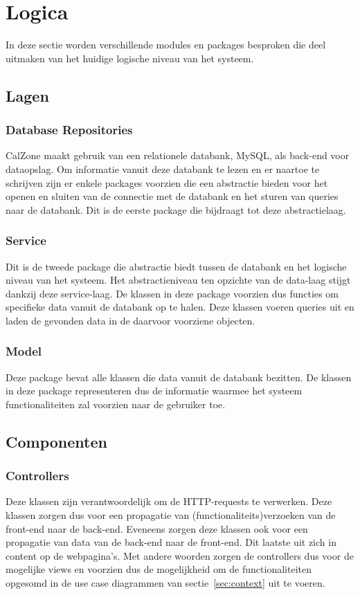 \section{Logica}
\label{sec:logica}
In deze sectie worden verschillende modules en packages besproken die deel uitmaken van het huidige logische niveau van het systeem.

\subsection{Lagen}
\subsubsection{Database Repositories}
\label{subsubsec:databaseRepo}
CalZone maakt gebruik van een relationele databank, MySQL, als back-end voor dataopslag. 
Om informatie vanuit deze databank te lezen en er naartoe te schrijven zijn er enkele packages voorzien die een abstractie bieden voor het openen en sluiten van de connectie met de databank en het sturen van queries naar de databank.
Dit is de eerste package die bijdraagt tot deze abstractielaag.

\subsubsection{Service}
\label{subsubsec:service}
Dit is de tweede package die abstractie biedt tussen de databank en het logische niveau van het systeem. 
Het abstractieniveau ten opzichte van de data-laag stijgt dankzij deze service-laag.
De klassen in deze package voorzien dus functies om specifieke data vanuit de databank op te halen.
Deze klassen voeren queries uit en laden de gevonden data in de daarvoor voorziene objecten.

\subsubsection{Model}
\label{subsec:model}
Deze package bevat alle klassen die data vanuit de databank bezitten. De klassen in deze package representeren dus de informatie waarmee het systeem functionaliteiten zal voorzien naar de gebruiker toe.

\subsection{Componenten}
\subsubsection{Controllers}
\label{subsubsec:controllers}
Deze klassen zijn verantwoordelijk om de HTTP-requests te verwerken. 
Deze klassen zorgen dus voor een propagatie van (functionaliteits)verzoeken van de front-end naar de back-end. 
Eveneens zorgen deze klassen ook voor een propagatie van data van de back-end naar de front-end. 
Dit laatste uit zich in content op de webpagina's.
Met andere woorden zorgen de controllers dus voor de mogelijke views en voorzien dus de mogelijkheid om de functionaliteiten opgesomd in de use case diagrammen van sectie~\ref{sec:context} uit te voeren. 

